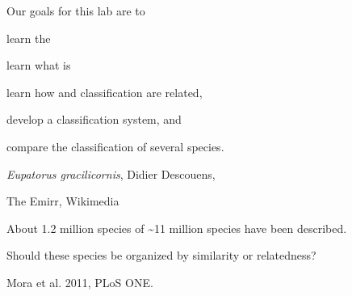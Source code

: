 \documentclass[t]{beamer}
\begin{document}

\begin{frame}[t]{Our goals for this lab are to }

	\hangpara learn the 
	
	\hangpara learn what is 
	
	\hangpara learn how  and classification are related,
	
	\hangpara develop a classification system, and 
	
	\hangpara compare the classification of several species.	
	
\end{frame}

%
%

{
\begin{frame}[b]
	\hfill\tiny \textit{Eupatorus gracilicornis}, Didier Descouens, 
\end{frame}
}

{
\begin{frame}[b]
	\tiny The Emirr, Wikimedia 
\end{frame}
}


{
\begin{frame}[b]{About 1.2 million species of \textasciitilde11 million species have been described.}

	\vspace*{13\baselineskip}
	
	{\large Should these species be organized by similarity or relatedness? }

	\vfilll

	\hfill\tiny Mora et al. 2011, PLoS ONE.
\end{frame}
}
\end{document}
